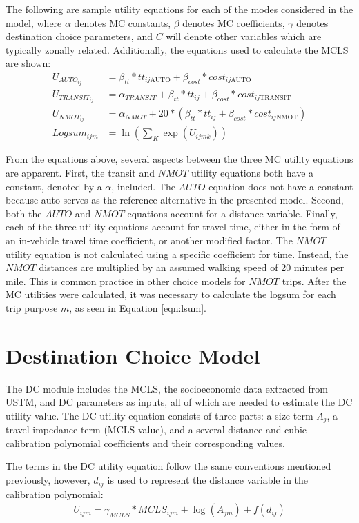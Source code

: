 The following are sample utility equations for each of the modes considered in
the model, where $\alpha$ denotes MC constants, $\beta$ denotes
MC coefficients, $\gamma$ denotes destination choice parameters, and
$C$ will denote other variables which are typically zonally related. Additionally,
the equations used to calculate the MCLS are shown:
\begin{align}
U_{{AUTO}_{ij}} &= \beta_{tt} * tt_{ij\mathrm{AUTO}} + \beta_{cost}* cost_{ij\mathrm{AUTO}} \\
U_{{TRANSIT}_{ij}} &= \alpha_{TRANSIT} + \beta_{tt} * tt_{ij} + \beta_{cost} * cost_{ij\mathrm{TRANSIT}} \\
U_{{NMOT}_{ij}} &= \alpha_{NMOT} + 20 * (\beta_{tt{}} * tt_{ij} + \beta_{cost} * cost_{ij\mathrm{NMOT}}) \\
Logsum_{ijm} &= \ln(\sum_K \exp (U_{ijmk})) \label{eqn:lsum}
\end{align}

From the equations above, several aspects between the three MC utility equations are
apparent. First, the transit and $NMOT$ utility equations both have a constant, denoted by a $\alpha$,
included. The $AUTO$ equation does not have a constant because auto serves as the reference
alternative in the presented model. Second, both the $AUTO$ and $NMOT$ equations account for a
distance variable. Finally, each of the three utility equations account for travel time, either in the
form of an in-vehicle travel time coefficient, or another modified factor. The $NMOT$ utility
equation is not calculated using a specific coefficient for time. Instead, the $NMOT$ distances are
multiplied by an assumed walking speed of 20 minutes per mile. This is common practice in other
choice models for $NMOT$ trips. After the MC utilities were calculated, it was necessary to calculate the logsum for
each trip purpose \(m\), as seen in Equation \ref{eqn:lsum}.

\section{Destination Choice Model}
\label{sec:dc}
The DC module
includes the MCLS, the socioeconomic data extracted
from USTM, and DC parameters as inputs, all of which are needed to estimate the DC utility value.
The DC utility equation consists of three parts: a size term \(A_j\),
a travel impedance term (MCLS value), and a several distance and cubic
calibration polynomial coefficients and their corresponding values.

The terms in the DC utility equation follow the same conventions mentioned
previously, however, \(d_{ij}\) is used to represent the distance variable in the calibration polynomial:
\begin{equation}
\begin{aligned}
	U_{ijm} = \gamma_{MCLS} * MCLS_{ijm} + \log (A_{jm}) + f(d_{ij})
\label{eqn:dc}
\end{aligned}
\end{equation}

